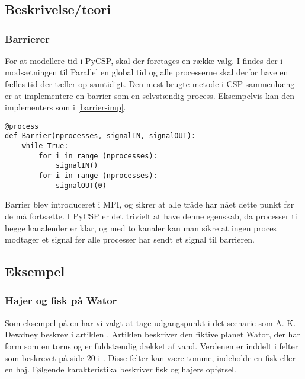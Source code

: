 \chapter{\des}
  \section{Beskrivelse/teori}
    
\subsection{Barrierer}\label{barrier}
For at modellere tid i PyCSP, skal der foretages en 
række valg. I \des findes der i modsætningen til 
Parallel \des {} en global tid og alle processerne skal derfor have  en 
fælles tid der tæller op samtidigt. Den mest brugte metode i CSP sammenhæng er 
at implementere en barrier som en selvstændig process. Eksempelvis kan den implementers som i \autoref{barrier-imp}.

\begin{lstlisting}[label=barrier-imp,caption=En barrier i PyCSP]
@process
def Barrier(nprocesses, signalIN, signalOUT):
	while True:
		for i in range (nprocesses):
			signalIN()
		for i in range (nprocesses):
			signalOUT(0)
\end{lstlisting}

Barrier blev introduceret i MPI, og sikrer at alle tråde har nået dette punkt 
før de må fortsætte. I PyCSP er det trivielt at have  denne egenskab, da 
processer til begge kanalender er klar, og med to kanaler kan man sikre at 
ingen proces modtager et signal før alle processer har sendt et signal til 
barrieren.

\section{Eksempel}


\subsection{Hajer og fisk på Wator} Som eksempel på en \des har vi valgt at tage 
udgangspunkt i det scenarie som A. K. Dewdney
beskrev i artiklen \cite{wator}. Artiklen beskriver den
fiktive planet Wator, der har form som en torus og er fuldstændig
dækket af vand. Verdenen er inddelt i felter som beskrevet på side
20 i \cite{wator}. Disse felter kan være tomme, indeholde en
fisk eller en haj. Følgende karakteristika beskriver fisk og hajers
opførsel.


